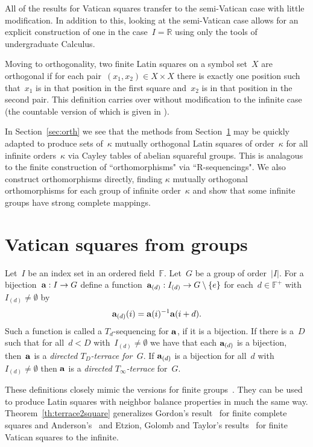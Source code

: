 \documentclass[12pt,a4paper]{article}
\newcommand{\R}{\mathbb{R}}
\newcommand{\F}{\mathbb{F}}
\renewcommand{\a}{\textup{\textbf{a}}}
\begin{document}
All of the results for Vatican squares transfer to the semi-Vatican case with little modification.  In addition to this, looking at the semi-Vatican case allows for an explicit construction of one in the case~$I = \R$ using only the tools of undergraduate Calculus.


Moving to orthogonality, two finite Latin squares on a symbol set~$X$ are orthogonal if for  each pair~$(x_1, x_2) \in X \times X$ there is exactly one position such that~$x_1$ is in that position in the first square and~$x_2$ is in that position in the second pair.  This definition carries over without modification to the infinite case (the countable version of which is given in \cite[p.~116]{DK15}).

In Section~\ref{sec:orth} we see that the methods from Section~\ref{sec:cayley} may be quickly adapted to produce sets of~$\kappa$ mutually orthogonal Latin squares of order~$\kappa$ for all infinite orders~$\kappa$ via Cayley tables of abelian squareful groups.  This is analagous to the finite construction of ``orthomorphisms" via ``R-sequencings".   We also construct orthomorphisms directly, finding $\kappa$ mutually orthogonal orthomorphisms for each group of infinite order~$\kappa$ and show that some infinite groups have strong complete mappings.


\section{Vatican squares from groups}\label{sec:cayley}


Let~$I$ be an index set in an ordered field~$\F$.  Let~$G$ be a group of order~$|I|$.  For a bijection~${\bf a}: I \rightarrow G$ define a function~${\bf a}_{(d)}: I_{(d)} \rightarrow G \setminus \{ e \}$ for each~$d \in \F^+$ with~$I_{(d)} \neq \emptyset$ by
$${\bf a}_{(d)}(i) = {\bf a}(i)^{-1}{\bf a}(i+d).$$ Such a function is called a $T_d$-sequencing for $\a$, if it is a bijection.
If there is a~$D$ such that for all~$d < D$ with~$I_{(d)} \neq \emptyset$ we have that each ${\bf a}_{(d)}$ is a bijection, then~${\bf a}$ is a {\em directed $T_D$-terrace for~$G$}.  If ${\bf a}_{(d)}$ is a bijection for all~$d$  with~$I_{(d)} \neq \emptyset$ then ${\bf a}$ is  a {\em directed $T_{\infty}$-terrace} for~$G$.

These definitions closely mimic the versions for finite groups~\cite{Anderson90}.   They can be used to produce Latin squares with neighbor balance properties in much the same way.  Theorem~\ref{th:terrace2square} generalizes Gordon's result~\cite{Gordon61} for finite complete squares and Anderson's~\cite{Anderson90} and Etzion, Golomb and Taylor's results~\cite{EGT89} for finite Vatican squares to the infinite.  
\end{document}
